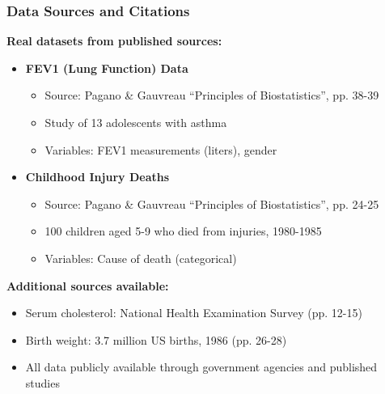 \documentclass{beamer}
\begin{document}
\begin{frame}
\frametitle{Data Sources and Citations}
\textbf{Real datasets from published sources:}

\vspace{0.4cm}
\begin{itemize}
\item \textbf{FEV1 (Lung Function) Data}
  \begin{itemize}
  \item Source: Pagano \& Gauvreau ``Principles of Biostatistics'', pp. 38-39
  \item Study of 13 adolescents with asthma
  \item Variables: FEV1 measurements (liters), gender
  \end{itemize}
\item \textbf{Childhood Injury Deaths}
  \begin{itemize}
  \item Source: Pagano \& Gauvreau ``Principles of Biostatistics'', pp. 24-25
  \item 100 children aged 5-9 who died from injuries, 1980-1985
  \item Variables: Cause of death (categorical)
  \end{itemize}
\end{itemize}

\vspace{0.4cm}
\textbf{Additional sources available:}
\begin{itemize}
\item Serum cholesterol: National Health Examination Survey (pp. 12-15)
\item Birth weight: 3.7 million US births, 1986 (pp. 26-28)
\item All data publicly available through government agencies and published studies
\end{itemize}
\end{frame}
\end{document}
